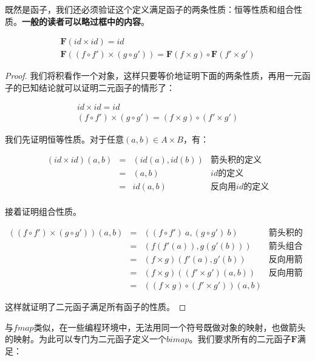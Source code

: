 \documentclass{article}
\begin{document}
\begin{mdframed}
既然是函子，我们还必须验证这个定义满足函子的两条性质：恒等性质和组合性质。\textbf{一般的读者可以略过框中的内容}。

\[
\begin{array}{l}
\mathbf{F}(id \times id) = id \\
\mathbf{F}((f \circ f') \times (g \circ g')) = \mathbf{F}(f \times g) \circ \mathbf{F} (f' \times g')
\end{array}
\]

\begin{proof}
我们将积看作一个对象，这样只要等价地证明下面的两条性质，再用一元函子的已知结论就可以证明二元函子的情形了：

\[
\begin{array}{l}
id \times id = id \\
(f \circ f') \times (g \circ g') = (f \times g) \circ (f' \times g')
\end{array}
\]

我们先证明恒等性质。对于任意$(a, b) \in A \times B$，有：

\[
\begin{array}{rcll}
(id \times id)(a, b) & = & (id(a), id(b)) & \text{箭头积的定义} \\
                     & = & (a, b) & \text{$id$的定义} \\
                     & = & id(a, b) & \text{反向用$id$的定义} \\
\end{array}
\]

接着证明组合性质。

\[
\begin{array}{rcll}
((f \circ f') \times (g \circ g'))(a, b) & = & ((f \circ f')\ a, (g \circ g')\ b) & \text{箭头积的定义} \\
    & = & (f(f'(a)), g(g'(b))) & \text{箭头组合的定义} \\
    & = & (f \times g)(f'(a), g'(b)) & \text{反向用箭头积的定义} \\
    & = & (f \times g)((f' \times g')(a, b)) & \text{反向用箭头积的定义} \\
    & = & ((f \times g) \circ (f' \times g'))(a, b)
\end{array}
\]

这样就证明了二元函子满足所有函子的性质。
\end{proof}
\end{mdframed}

与$fmap$类似，在一些编程环境中，无法用同一个符号既做对象的映射，也做箭头的映射。为此可以专门为二元函子定义一个$bimap$。我们要求所有的二元函子$\mathbf{F}$满足：
\end{document}
